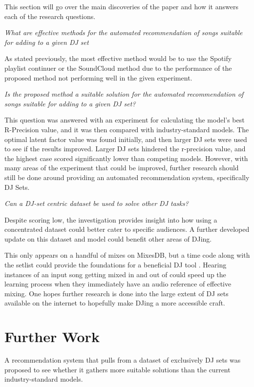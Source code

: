 This section will go over the main discoveries of the paper and how it answers each of the research questions.

\textit{What are effective methods for the automated recommendation of songs suitable
	for adding to a given DJ set}

As stated previously, the most effective method would be to use the Spotify playlist continuer or the SoundCloud method due to the performance of the proposed method not performing well in the given experiment. 

\break
\textit{Is the proposed method a suitable solution for the automated recommendation of songs suitable for adding to a given DJ set?}

This question was answered with an experiment for calculating the model's best R-Precision value, and it was then compared with industry-standard models. The optimal latent factor value was found initially, and then larger DJ sets were used to see if the results improved. Larger DJ sets hindered the r-precision value, and the highest case scored significantly lower than competing models. However, with many areas of the experiment that could be improved, further research should still be done around providing an automated recommendation system, specifically DJ Sets.

\textit{Can a DJ-set centric dataset be used to solve other DJ tasks?}


Despite scoring low, the investigation provides insight into how using a concentrated dataset could better cater to specific audiences. A further developed update on this dataset and model could benefit other areas of DJing. 

This only appears on a handful of mixes on MixesDB, but a time code along with the setlist could provide the foundations for a beneficial DJ tool \citep{mixesdb_2015-01-02_2015}. Hearing instances of an input song getting mixed in and out of could speed up the learning process when they immediately have an audio reference of effective mixing. One hopes further research is done into the large extent of DJ sets available on the internet to hopefully make DJing a more accessible craft. 

\section{Further Work}

A recommendation system that pulls from a dataset of exclusively DJ sets was proposed to see whether it gathers more suitable solutions than the current industry-standard models. 

